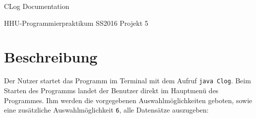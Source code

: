 \documentclass[oneside,12pt]{scrartcl}
\newcommand{\code}[1]{\texttt{#1}}
\begin{document}
\setlength{\parindent}{0pt} %
\cofoot{}
\rofoot{\pagemark}

\begin{center}
\Huge{CLog Documentation} \par
\Large{HHU-Programmierpraktikum SS2016 Projekt 5}
\end{center}

\section{Beschreibung}
Der Nutzer startet das Programm im Terminal mit dem Aufruf \code{java Clog}. Beim Starten des Programms landet der Benutzer direkt im Hauptmenü des Programmes. Ihm werden die vorgegebenen Auswahlmöglichkeiten geboten, sowie eine zusätzliche Auswahlmöglichkeit \code{6}, alle Datensätze auszugeben:
\end{document}
